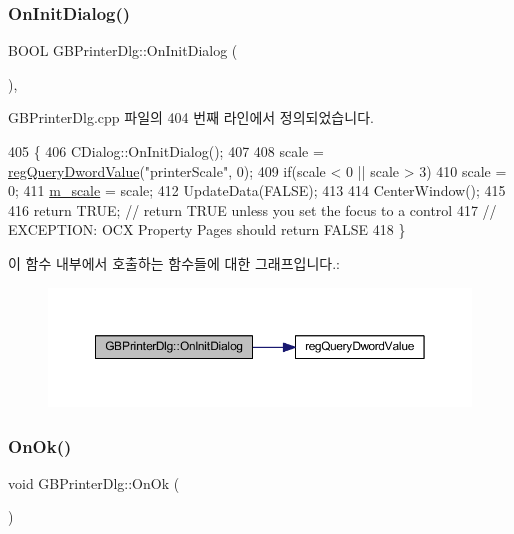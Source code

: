 \subsubsection{\texorpdfstring{On\+Init\+Dialog()}{OnInitDialog()}}
{\footnotesize\ttfamily B\+O\+OL G\+B\+Printer\+Dlg\+::\+On\+Init\+Dialog (\begin{DoxyParamCaption}{ }\end{DoxyParamCaption})\hspace{0.3cm}{\ttfamily [protected]}, {\ttfamily [virtual]}}



G\+B\+Printer\+Dlg.\+cpp 파일의 404 번째 라인에서 정의되었습니다.


\begin{DoxyCode}
405 \{
406   CDialog::OnInitDialog();
407   
408   scale = \mbox{\hyperlink{_reg_8cpp_a150640889ffff4851ee26d7b999ec7c3}{regQueryDwordValue}}(\textcolor{stringliteral}{"printerScale"}, 0);
409   \textcolor{keywordflow}{if}(scale < 0 || scale > 3)
410     scale = 0;
411   \mbox{\hyperlink{class_g_b_printer_dlg_a0d0e4757bd074a2ab18268b938f76f85}{m\_scale}} = scale;
412   UpdateData(FALSE);
413   
414   CenterWindow();
415   
416   \textcolor{keywordflow}{return} TRUE;  \textcolor{comment}{// return TRUE unless you set the focus to a control}
417                 \textcolor{comment}{// EXCEPTION: OCX Property Pages should return FALSE}
418 \}
\end{DoxyCode}
이 함수 내부에서 호출하는 함수들에 대한 그래프입니다.\+:
\nopagebreak
\begin{figure}[H]
\begin{center}
\leavevmode
\includegraphics[width=350pt]{class_g_b_printer_dlg_a0e1d0d5e238e3133e088bd1be4711755_cgraph}
\end{center}
\end{figure}
\mbox{\label{class_g_b_printer_dlg_aa66f44a9ecd963327cf019c25ad3c54d}} 
\subsubsection{\texorpdfstring{On\+Ok()}{OnOk()}}
{\footnotesize\ttfamily void G\+B\+Printer\+Dlg\+::\+On\+Ok (\begin{DoxyParamCaption}{ }\end{DoxyParamCaption})\hspace{0.3cm}{\ttfamily [protected]}}



